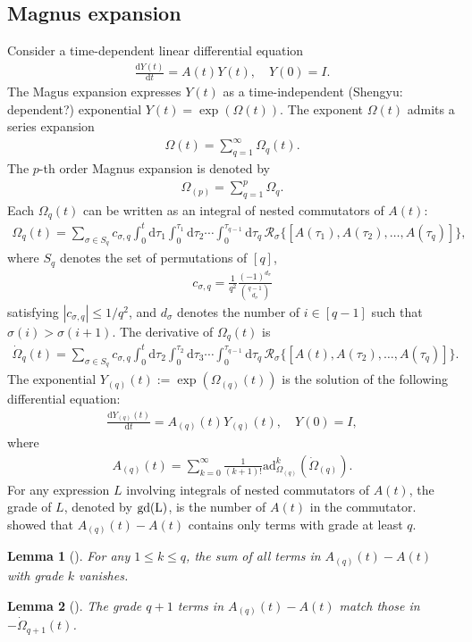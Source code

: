 \documentclass[11pt]{article}
\newtheorem{lemma}{Lemma}
\renewcommand{\d}{\mathrm{d}}
\newcommand{\ad}{\mathrm{ad}}
\newcommand{\mc}{\mathcal}
\newcommand{\syz}[1]{{\color{teal} (Shengyu: #1)}}
\begin{document}
\subsection{Magnus expansion}
Consider a time-dependent linear differential equation \begin{align*}
    \frac{\d Y(t)}{\d t} = A(t) Y(t), \quad Y(0) = I.
\end{align*} The Magus expansion expresses $Y(t)$ as a time-independent \syz{dependent?} exponential $Y(t) = \exp(\Omega(t))$. The exponent $\Omega(t)$ admits a series expansion \begin{align*}
    \Omega(t) = \sum_{q = 1}^{\infty} \Omega_q(t).
\end{align*} 
The $p$-th order Magnus expansion is denoted by \begin{align}
    \Omega_{(p)} = \sum_{q=1}^{p} \Omega_q.
\end{align}
Each $\Omega_q(t)$ can be written as an integral of nested commutators of $A(t)$:
\begin{align}
\label{eq:magnus-formula}
    \Omega_q(t) = \sum_{\sigma\in S_q} c_{\sigma, q}  \int_{0}^t \d \tau_1 \int_{0}^{\tau_1}\d \tau_2 \cdots \int_{0}^{\tau_{q-1}}\d \tau_q \, \mc R_{\sigma}\big\{[A(\tau_1), A(\tau_2), \ldots, A(\tau_q)] \big\},
\end{align}
where $S_q$ denotes the set of permutations of $[q]$, \begin{align*}
    c_{\sigma, q}=\frac{1}{q^2}\frac{(-1)^{d_{\sigma}}}{\binom{q-1}{d_\sigma}} 
\end{align*} satisfying $|c_{\sigma, q}|\le 1/q^2$, and $d_{\sigma}$ denotes the number of $i\in[q-1]$ such that $\sigma(i)>\sigma(i+1)$. The derivative of $\Omega_q(t)$ is
\begin{align}
    \dot{\Omega}_q(t) = \sum_{\sigma\in S_q} c_{\sigma, q}  \int_{0}^{t}\d \tau_2 \int_0^{\tau_2} \d\tau_3 \cdots \int_{0}^{\tau_{q-1}}\d \tau_q \, \mc R_{\sigma}\big\{[A(t), A(\tau_2), \ldots, A(\tau_q)] \big\}.
\end{align}
The exponential $Y_{(q)}(t) :=\exp(\Omega_{(q)}(t))$ is the solution of the following differential equation: \begin{align*}
    \frac{\d Y_{(q)}(t)}{\d t} = A_{(q)}(t) Y_{(q)}(t), \quad Y(0) = I,
\end{align*}
where \begin{align*}
    A_{(q)}(t)  = \sum_{k = 0}^{\infty}\frac{1}{(k+1)!}\ad_{\Omega_{(q)}}^k(\dot\Omega_{(q)}).
\end{align*}
For any expression $L$ involving integrals of nested commutators of $A(t)$, the grade of $L$, denoted by $\rm gd(L)$, is the number of $A(t)$ in the commutator. \citet{fang2025high} showed that $A_{(q)}(t)-A(t)$ contains only terms with grade at least $q$. 
\begin{lemma}[{\cite[Proposition~3]{fang2025high}}]
\label{lem:grade-cond}
    For any $1\le k\le q$, the sum of all terms in $A_{(q)}(t) -A(t)$ with grade $k$ vanishes. 
\end{lemma} 
\begin{lemma}[{\cite[Lemma~4]{fang2025high}}]
\label{lem:grade-cond-q+1}
    The grade $q+1$ terms in $A_{(q)}(t) -A(t)$ match those in $-\dot\Omega_{q+1}(t)$.
\end{lemma}
\end{document}
